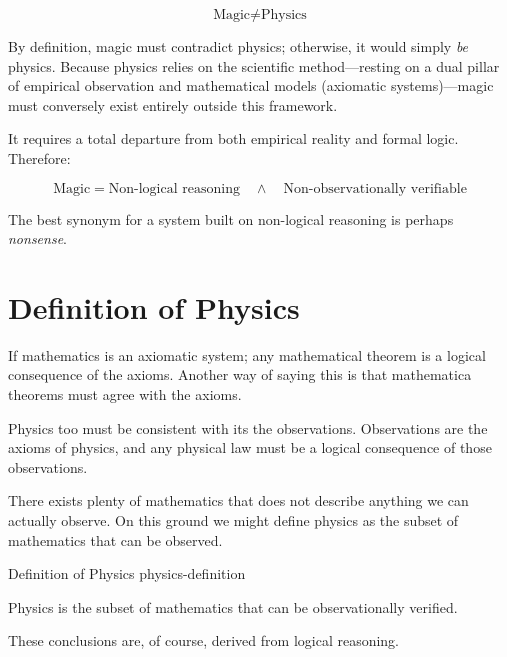 \[
\text{Magic} \neq \text{Physics}
\]

By definition, magic must contradict physics; otherwise, it would simply \emph{be} physics.
Because physics relies on the scientific method—resting on a dual pillar of empirical observation and mathematical models (axiomatic systems)—magic must conversely exist entirely outside this framework. 

It requires a total departure from both empirical reality and formal logic. Therefore:

\[
\text{Magic} = \text{Non-logical reasoning} \quad \land \quad \text{Non-observationally verifiable}
\]

The best synonym for a system built on non-logical reasoning is perhaps \emph{nonsense}.



\section*{Definition of Physics}

If mathematics is an axiomatic system; any mathematical theorem is a logical consequence of the axioms. Another way of saying this is that mathematica theorems must agree with the axioms. 

Physics too must be consistent with its the observations. Observations are the axioms of physics, and any physical law must be a logical consequence of those observations.

There exists plenty of mathematics that does not describe anything we can actually observe. On this ground we might define physics as the subset of mathematics that can be observed.


\begin{principle}{Definition of Physics}
{physics-definition}

 Physics is the subset of mathematics that can be observationally verified.

\end{principle}



These conclusions are, of course, derived from logical reasoning. 
